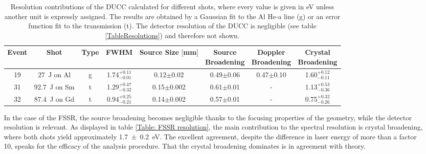\begin{table}[H]
	\centering
	\caption{Resolution contributions of the DUCC calculated for different shots, where every value is given in eV unless another unit is expressly assigned. The results are obtained by a Gaussian fit to the Al He-a line (g) or an error function fit to the transmission (t). The detector resolution of the DUCC is negligible (see table \ref{TableResolutions}) and therefore not shown.}
	\vspace{0.05cm}
	\renewcommand{\arraystretch}{1.5}
	\centering
	\begin{tabular}{|c|c|c|c|c|c|c|c|} 
		\hline
		Event & Shot & Type & FWHM & \makecell{Source Size \\ $[$mm$]$} & \makecell{Source \\ Broadening} & \makecell{Doppler \\ Broadening} & \makecell{Crystal \\ Broadening} \\ 
		[0.5ex]
		\hline\hline
		19 & \SI{27}{\joule} on Al & g & 1.74$^{+0.11}_{-0.01}$ & 0.12$\pm$0.02 & 0.49$\pm$0.06 & 0.47$\pm$0.10 & 
		1.60$^{+0.12}_{-0.11}$ \\ 
		[0.5ex]
		\hline
		31 & \SI{92.7}{\joule} on Sm & t & 1.29$^{+0.47}_{-0.32}$ & 0.15$\pm$0.002 & 0.61$\pm$0.01 & - & 
		1.13$^{+0.53}_{-0.36}$ \\ 
		[0.5ex]
		\hline
		32 & \SI{87.4}{\joule} on Gd & t & 0.94$^{+0.25}_{-0.21}$ & 0.14$\pm$0.002 & 0.57$\pm$0.01 & - & 
		0.75$^{+0.32}_{-0.26}$ \\  
		[0.5ex]
		\hline
	\end{tabular}
	\label{Table: DUCC resolution}
\end{table}

In the case of the FSSR, the source broadening becomes negligible thanks to the focusing properties of the geometry, while the detector resolution is relevant. As displayed in table \ref{Table: FSSR resolution}, the main contribution to the spectral resolution is crystal broadening, where both shots yield approximately \SI{1.7\pm0.2}{\electronvolt}. The excellent agreement, despite the difference in laser energy of more than a factor 10, speaks for the efficacy of the analysis procedure. That the crystal broadening dominates is in agreement with theory.

